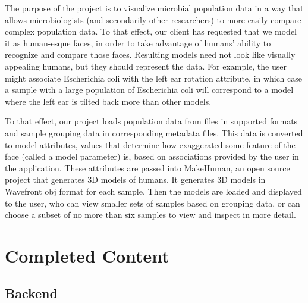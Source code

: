 \documentclass[letterpaper,10pt, onecolumn, draftclsnofoot]{IEEEtran}
\begin{document}
The purpose of the project is to visualize microbial population data in a way that allows microbiologists (and secondarily other researchers) to more easily compare complex population data. To that effect, our client has requested that we model it as human-esque faces, in order to take advantage of humans' ability to recognize and compare those faces. Resulting models need not look like visually appealing humans, but they should represent the data. For example, the user might associate Escherichia coli with the left ear rotation attribute, in which case a sample with a large population of Escherichia coli will correspond to a model where the left ear is tilted back more than other models.

To that effect, our project loads population data from files in supported formats and sample grouping data in corresponding metadata files. This data is converted to model attributes, values that determine how exaggerated some feature of the face (called a model parameter) is, based on associations provided by the user in the application. These attributes are passed into MakeHuman, an open source project that generates 3D models of humans. It generates 3D models in Wavefront obj format for each sample. Then the models are loaded and displayed to the user, who can view smaller sets of samples based on grouping data, or can choose a subset of no more than six samples to view and inspect in more detail.

\section{Completed Content}

\subsection{Backend}
\end{document}
